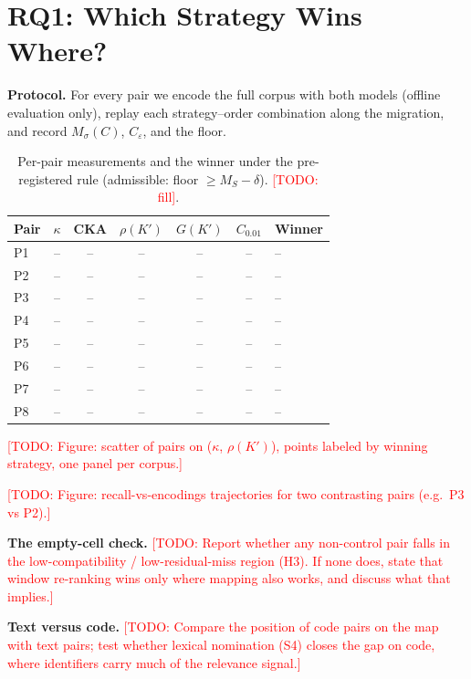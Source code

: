 \documentclass[conference]{IEEEtran}
\newcommand{\todo}[1]{\textcolor{red}{[TODO: #1]}}
\begin{document}
\section{RQ1: Which Strategy Wins Where?}\label{sec:rq1}

\textbf{Protocol.} For every pair we encode the full corpus with both models (offline
evaluation only), replay each strategy--order combination along the migration, and
record $M_\sigma(C)$, $C_\varepsilon$, and the floor.

\begin{table}[t]
\centering
\caption{Per-pair measurements and the winner under the pre-registered rule (admissible: floor $\ge M_S-\delta$). \todo{fill}.}
\label{tab:map}
\small
\begin{tabular}{@{}lcccccl@{}}
\toprule
Pair & $\kappa$ & CKA & $\rho(K')$ & $G(K')$ & $C_{0.01}$ & Winner \\
\midrule
P1 & -- & -- & -- & -- & -- & -- \\
P2 & -- & -- & -- & -- & -- & -- \\
P3 & -- & -- & -- & -- & -- & -- \\
P4 & -- & -- & -- & -- & -- & -- \\
P5 & -- & -- & -- & -- & -- & -- \\
P6 & -- & -- & -- & -- & -- & -- \\
P7 & -- & -- & -- & -- & -- & -- \\
P8 & -- & -- & -- & -- & -- & -- \\
\bottomrule
\end{tabular}
\end{table}

\todo{Figure: scatter of pairs on ($\kappa$, $\rho(K')$), points labeled by winning
strategy, one panel per corpus.}

\todo{Figure: recall-vs-encodings trajectories for two contrasting pairs (e.g.\ P3 vs P2).}

\textbf{The empty-cell check.} \todo{Report whether any non-control pair falls in the
low-compatibility / low-residual-miss region (H3). If none does, state that window
re-ranking wins only where mapping also works, and discuss what that implies.}

\textbf{Text versus code.} \todo{Compare the position of code pairs on the map with text
pairs; test whether lexical nomination (S4) closes the gap on code, where identifiers
carry much of the relevance signal.}
\end{document}
